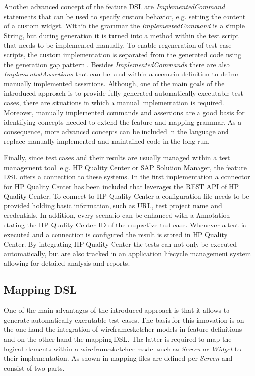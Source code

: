 \documentclass{sig-alternate-05-2015}
\begin{document}
Another advanced concept of the feature DSL are \textit{ImplementedCommand} statements that can be used to specify custom behavior, e.g. setting the content of a custom widget.
Within the grammar the \textit{ImplementedCommand} is a simple String, but during generation it is turned into a method within the test script that needs to be implemented manually. 
To enable regeneration of test case scripts, the custom implementation is separated from the generated code using the generation gap pattern \cite{behrens.2009}.
Besides \textit{ImplementedCommands} there are also \textit{ImplementedAssertions} that can be used within a scenario definition to define manually implemented assertions.
Although, one of the main goals of the introduced approach is to provide fully generated automatically executable test cases, there are situations in which a manual implementation is required. 
Moreover, manually implemented commands and assertions are a good basis for identifying concepts needed to extend the feature and mapping grammar.
As a consequence, more advanced concepts can be included in the language and replace manually implemented and maintained code in the long run.

Finally, since test cases and their results are usually managed within a test management tool, e.g. HP Quality Center or SAP Solution Manager, the feature DSL offers a connection to these systems.
In the first implementation a connector for HP Quality Center has been included that leverages the REST API of HP Quality Center.
To connect to HP Quality Center a configuration file needs to be provided holding basic information, such as URL, test project name and credentials.
In addition, every scenario can be enhanced with a Annotation stating the HP Quality Center ID of the respective test case.
Whenever a test is executed and a connection is configured the result is stored in HP Quality Center.
By integrating HP Quality Center the tests can not only be executed automatically, but are also tracked in an application lifecycle management system allowing for detailed analysis and reports.


\subsection{Mapping DSL}
One of the main advantages of the introduced approach is that it allows to generate automatically executable test cases.
The basis for this innovation is on the one hand the integration of wireframesketcher models in feature definitions and on the other hand the mapping DSL.
The latter is required to map the logical elements within a wireframesketcher model such as \textit{Screen} or \textit{Widget} to their implementation.
As shown in  mapping files are defined per \textit{Screen} and consist of two parts.
\end{document}
